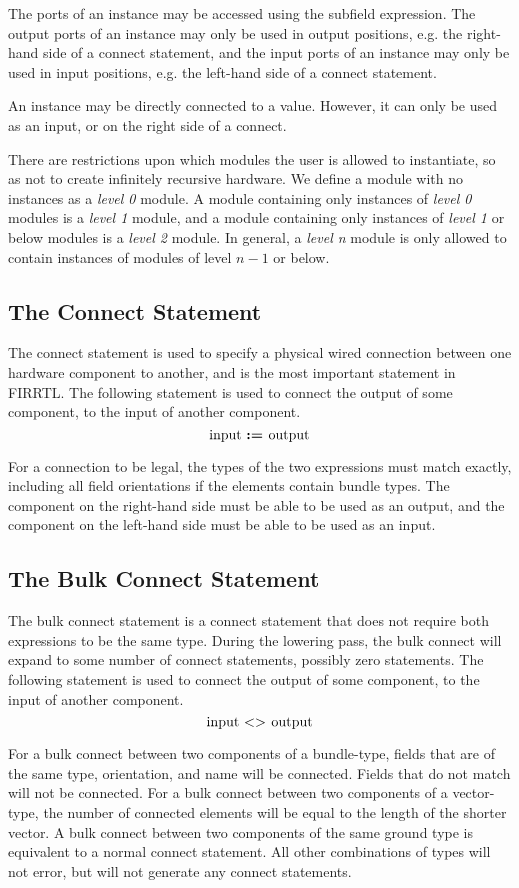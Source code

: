\documentclass[10pt]{article}
\begin{document}
The ports of an instance may be accessed using the subfield expression.
The output ports of an instance may only be used in output positions, e.g. the right-hand side of a connect statement, and the input ports of an instance may only be used in input positions, e.g. the left-hand side of a connect statement.

An instance may be directly connected to a value. However, it can only be used as an input, or on the right side of a connect.

There are restrictions upon which modules the user is allowed to instantiate, so as not to create infinitely recursive hardware.
We define a module with no instances as a {\em level 0} module.
A module containing only instances of {\em level 0} modules is a {\em level 1} module, and a module containing only instances of {\em level 1} or below modules is a {\em level 2} module.
In general, a {\em level n} module is only allowed to contain instances of modules of level $n-1$ or below. 

\subsection{The Connect Statement}
The connect statement is used to specify a physical wired connection between one hardware component to another, and is the most important statement in FIRRTL.
The following statement is used to connect the output of some component, to the input of another component. 
\[
\text{input } \text{\bf :=\ } \text{output} 
\]

For a connection to be legal, the types of the two expressions must match exactly, including all field orientations if the elements contain bundle types.
The component on the right-hand side must be able to be used as an output, and the component on the left-hand side must be able to be used as an input.

\subsection{The Bulk Connect Statement}
The bulk connect statement is a connect statement that does not require both expressions to be the same type. 
During the lowering pass, the bulk connect will expand to some number of connect statements, possibly zero statements.
The following statement is used to connect the output of some component, to the input of another component. 
\[
\text{input } \text{\bf $<>$\ } \text{output} 
\]

For a bulk connect between two components of a bundle-type, fields that are of the same type, orientation, and name will be connected.
Fields that do not match will not be connected.
For a bulk connect between two components of a vector-type, the number of connected elements will be equal to the length of the shorter vector.
A bulk connect between two components of the same ground type is equivalent to a normal connect statement.
All other combinations of types will not error, but will not generate any connect statements.
\end{document}
